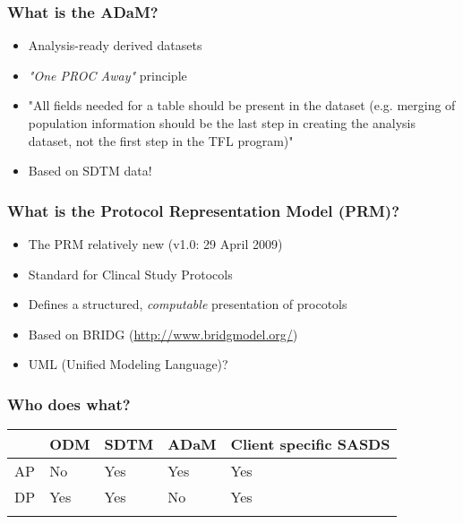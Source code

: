 \documentclass{beamer}
\begin{document}
\begin{frame}
  \frametitle{What is the ADaM?}

  \begin{itemize}
		\item Analysis-ready derived datasets
		\item \emph{"One PROC Away"} principle
		\item "All fields needed for a table should be present in the dataset (e.g. merging of population information should be the 
		      last step in creating the analysis dataset, not the first step in the TFL program)"
      \item Based on SDTM data!      
  \end{itemize}
\end{frame}

\begin{frame}
	\frametitle{What is the Protocol Representation Model (PRM)?}
	\begin{itemize}
		\item The PRM relatively new (v1.0: 29 April 2009)
		\item Standard for Clincal Study Protocols	
		\item Defines a structured, \emph{computable} presentation of procotols
		\item Based on BRIDG (\url{http://www.bridgmodel.org/})
		\item UML (Unified Modeling Language)?
	\end{itemize}
\end{frame}

\begin{frame}
	\frametitle{Who does what?}
	\begin{tabular}{|p{18mm}|p{18mm}|p{18mm}|p{18mm}|p{18mm}|}
	\hline       & ODM  & SDTM & ADaM & Client specific SASDS \\ 
	\hline AP    & No   & Yes  & Yes  & Yes \\ 
	\hline DP    & Yes  & Yes  & No   & Yes \\ 
   \hline \\ 
	\end{tabular}    
\end{frame}
\end{document}
